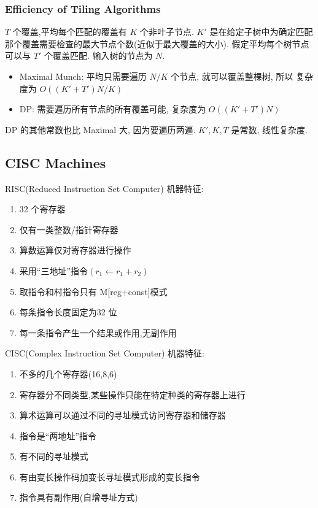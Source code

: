 \subsubsection{Efficiency of Tiling Algorithms}
$T$ 个覆盖,平均每个匹配的覆盖有 $K$ 个非叶子节点. $K'$ 是在给定子树中为确定匹配那个覆盖需要检查的最大节点个数(近似于最大覆盖的大小). 假定平均每个树节点可以与 $T'$ 个覆盖匹配. 输入树的节点为 $N$.
\begin{itemize}
    \item Maximal Munch: 平均只需要遍历 $N/K$ 个节点, 就可以覆盖整棵树, 所以 复杂度为 $O((K'+T')N/K)$
    \item DP: 需要遍历所有节点的所有覆盖可能, 复杂度为 $O((K'+T')N)$
\end{itemize}
DP 的其他常数也比 Maximal 大, 因为要遍历两遍. $K',K,T$ 是常数, 线性复杂度.

\subsection{CISC Machines}
RISC(Reduced Instruction Set Computer) 机器特征:
\begin{enumerate}
    \item 32 个寄存器
    \item 仅有一类整数/指针寄存器
    \item 算数运算仅对寄存器进行操作
    \item 采用``三地址''指令$(r_1\leftarrow r_1+r_2)$
    \item 取指令和村指令只有 M[reg+const]模式
    \item 每条指令长度固定为32 位
    \item 每一条指令产生一个结果或作用,无副作用
\end{enumerate}

CISC(Complex Instruction Set Computer) 机器特征:
\begin{enumerate}
    \item 不多的几个寄存器(16,8,6)
    \item 寄存器分不同类型,某些操作只能在特定种类的寄存器上进行
    \item 算术运算可以通过不同的寻址模式访问寄存器和储存器
    \item 指令是``两地址''指令
    \item 有不同的寻址模式
    \item 有由变长操作码加变长寻址模式形成的变长指令
    \item 指令具有副作用(自增寻址方式)
\end{enumerate}

